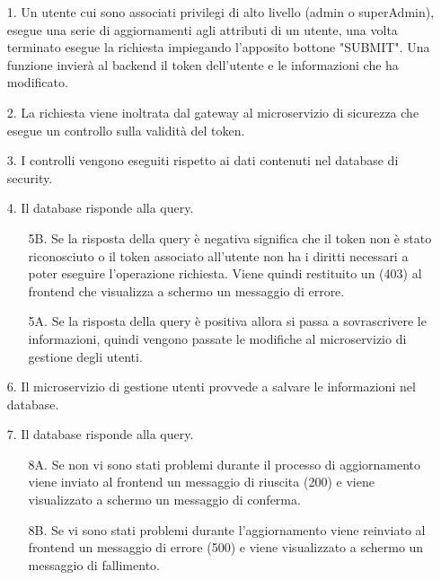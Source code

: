 \begin{itemize}
    \item[1.] Un utente cui sono associati privilegi di alto livello (admin o superAdmin), esegue una serie di aggiornamenti agli attributi di un utente, una volta terminato esegue la richiesta impiegando l'apposito bottone "SUBMIT". Una funzione invierà al backend il token dell'utente e le informazioni che ha modificato.
    \item[2.] La richiesta viene inoltrata dal gateway al microservizio di sicurezza che esegue un controllo sulla validità del token.
    \item[3.] I controlli vengono eseguiti rispetto ai dati contenuti nel database di security.
    \item[4.] Il database risponde alla query.
    \begin{itemize}
        \item[5B.] Se la risposta della query è negativa significa che il token non è stato riconosciuto o il token associato all'utente non ha i diritti necessari a poter eseguire l'operazione richiesta. Viene quindi restituito un (403) al frontend che visualizza a schermo un messaggio di errore.
        \item[5A.] Se la risposta della query è positiva allora si passa a sovrascrivere le informazioni, quindi vengono passate le modifiche al microservizio di gestione degli utenti.
    \end{itemize}
    \item[6.] Il microservizio di gestione utenti provvede a salvare le informazioni nel database.
    \item[7.] Il database risponde alla query.
    \begin{itemize}
        \item[8A.] Se non vi sono stati problemi durante il processo di aggiornamento viene inviato al frontend un messaggio di riuscita (200) e viene visualizzato a schermo un messaggio di conferma.
        \item[8B.] Se vi sono stati problemi durante l'aggiornamento viene reinviato al frontend un messaggio di errore (500) e viene visualizzato a schermo un messaggio di fallimento. 
    \end{itemize}
\end{itemize}



